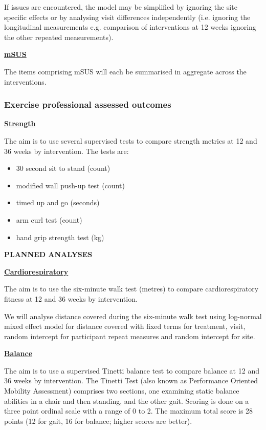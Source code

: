 \documentclass[11pt,parskip=half-]{scrartcl}
\providecommand{\tightlist}{%
  \setlength{\itemsep}{0pt}\setlength{\parskip}{0pt}}
\begin{document}
If issues are encountered, the model may be simplified by ignoring the site specific effects or by analysing visit differences independently (i.e. ignoring the longitudinal measurements e.g. comparison of interventions at 12 weeks ignoring the other repeated measurements).

\label{analysis:msus}
\hyperref[outcome:msus]{\textbf{mSUS}}

The items comprising mSUS will each be summarised in aggregate across the interventions.

\subsubsection{Exercise professional assessed outcomes}\label{exercise-professional-assessed-outcomes}

\label{analysis:strength}
\hyperref[epa-outcomes]{\textbf{Strength}}

The aim is to use several supervised tests to compare strength metrics at 12 and 36 weeks by intervention. The tests are:

\begin{itemize}
  \tightlist
  \item 30 second sit to stand (count)
  \item modified wall push-up test (count)
  \item timed up and go (seconds)
  \item arm curl test (count)
  \item hand grip strength test (kg)
\end{itemize}

\textbf{PLANNED ANALYSES}

\label{analysis:6mwt}
\hyperref[outcome:6mwt]{\textbf{Cardiorespiratory}}

The aim is to use the six-minute walk test (metres) to compare cardiorespiratory fitness at 12 and 36 weeks by intervention.

We will analyse distance covered during the six-minute walk test using log-normal mixed effect model for distance covered with fixed terms for treatment, visit, random intercept for participant repeat measures and random intercept for site.

\label{analysis:poma}
\hyperref[outcome:poma]{\textbf{Balance}}

The aim is to use a supervised Tinetti balance test to compare balance at 12 and 36 weeks by intervention. The Tinetti Test (also known as Performance Oriented Mobility Assessment) comprises two sections, one examining static balance abilities in a chair and then standing, and the other gait. Scoring is done on a three point ordinal scale with a range of 0 to 2. The maximum total score is 28 points (12 for gait, 16 for balance; higher scores are better).
\end{document}
